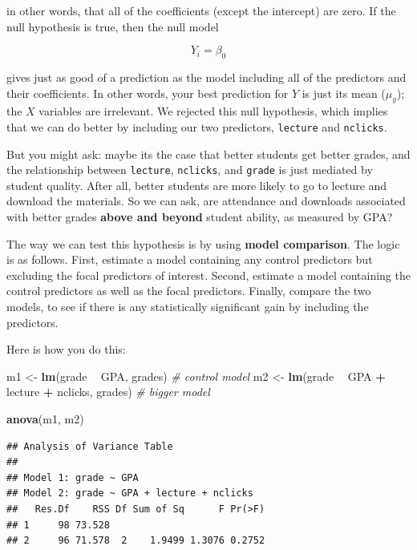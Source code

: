 \documentclass[]{book}
\newenvironment{Shaded}{\begin{snugshade}}{\end{snugshade}}
\newcommand{\CommentTok}[1]{\textcolor[rgb]{0.56,0.35,0.01}{\textit{#1}}}
\newcommand{\KeywordTok}[1]{\textcolor[rgb]{0.13,0.29,0.53}{\textbf{#1}}}
\newcommand{\NormalTok}[1]{#1}
\newcommand{\OperatorTok}[1]{\textcolor[rgb]{0.81,0.36,0.00}{\textbf{#1}}}
\newcommand{\StringTok}[1]{\textcolor[rgb]{0.31,0.60,0.02}{#1}}
\begin{document}
in other words, that all of the coefficients (except the intercept) are zero. If the null hypothesis is true, then the null model

\[Y_i = \beta_0\]

gives just as good of a prediction as the model including all of the predictors and their coefficients. In other words, your best prediction for \(Y\) is just its mean (\(\mu_y\)); the \(X\) variables are irrelevant. We rejected this null hypothesis, which implies that we can do better by including our two predictors, \texttt{lecture} and \texttt{nclicks}.

But you might ask: maybe its the case that better students get better grades, and the relationship between \texttt{lecture}, \texttt{nclicks}, and \texttt{grade} is just mediated by student quality. After all, better students are more likely to go to lecture and download the materials. So we can ask, are attendance and downloads associated with better grades \textbf{above and beyond} student ability, as measured by GPA?

The way we can test this hypothesis is by using \textbf{model comparison}. The logic is as follows. First, estimate a model containing any control predictors but excluding the focal predictors of interest. Second, estimate a model containing the control predictors as well as the focal predictors. Finally, compare the two models, to see if there is any statistically significant gain by including the predictors.

Here is how you do this:

\begin{Shaded}
\begin{Highlighting}[]
\NormalTok{m1 <-}\StringTok{ }\KeywordTok{lm}\NormalTok{(grade }\OperatorTok{~}\StringTok{ }\NormalTok{GPA, grades) }\CommentTok{# control model}
\NormalTok{m2 <-}\StringTok{ }\KeywordTok{lm}\NormalTok{(grade }\OperatorTok{~}\StringTok{ }\NormalTok{GPA }\OperatorTok{+}\StringTok{ }\NormalTok{lecture }\OperatorTok{+}\StringTok{ }\NormalTok{nclicks, grades) }\CommentTok{# bigger model}

\KeywordTok{anova}\NormalTok{(m1, m2)}
\end{Highlighting}
\end{Shaded}

\begin{verbatim}
## Analysis of Variance Table
## 
## Model 1: grade ~ GPA
## Model 2: grade ~ GPA + lecture + nclicks
##   Res.Df    RSS Df Sum of Sq      F Pr(>F)
## 1     98 73.528                           
## 2     96 71.578  2    1.9499 1.3076 0.2752
\end{verbatim}
\end{document}

